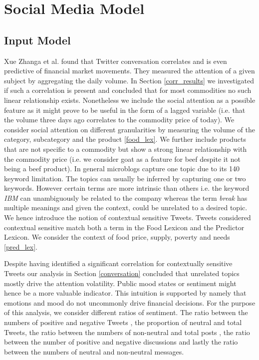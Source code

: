 \clearpage

\section{Social Media Model}

\subsection{Input Model }

Xue Zhanga et al. \cite{xue12} found that Twitter conversation correlates and is even predictive of financial market movements. They measured the attention of a given subject by aggregating the daily volume. In Section \ref{corr_results} we investigated if such a correlation is present and concluded that for most commodities no such linear relationship exists. Nonetheless we include the social attention as a possible feature as it might prove to be useful in the form of a lagged variable (i.e. that the volume three days ago correlates to the commodity price of today). We consider social attention on different granularities by measuring the volume of the category, subcategory and the product \ref{food_lex}. We further include products that are not specific to a commodity but show a strong linear relationship with the commodity price (i.e. we consider goat as a feature for beef despite it not being a beef product). 
In general microblogs capture one topic due to its 140 keyword limitation. The topics can usually be inferred by capturing one or two keywords. However certain terms are more intrinsic than others i.e. the keyword \emph{IBM} can unambiguously be related to the company whereas the  term \emph{break} has multiple meanings and given the context, could be unrelated to a desired topic. We hence introduce the notion of contextual sensitive Tweets. Tweets considered contextual sensitive match both a term in the Food Lexicon and the Predictor Lexicon. We consider the context of food price, supply, poverty and needs \ref{pred_lex}. 
 
 
 Despite having identified a significant correlation for contextually sensitive Tweets our analysis in Section \ref{conversation} concluded that unrelated topics mostly drive the attention volatility. Public mood states or sentiment might hence be a more valuable indicator. This intuition is supported by \cite{nofsinger05} namely that emotions and mood do not uncommonly drive financial decisions. For the purpose of this analysis, we consider different ratios of sentiment. The ratio between the numbers of positive and negative Tweets \cite{Nguyen12}, the proportion of neutral and total Tweets,  the ratio between the numbers of non-neutral and total posts \cite{Zhang09}, the ratio between the number of positive and negative discussions and lastly the ratio between the numbers of neutral and non-neutral messages. 

